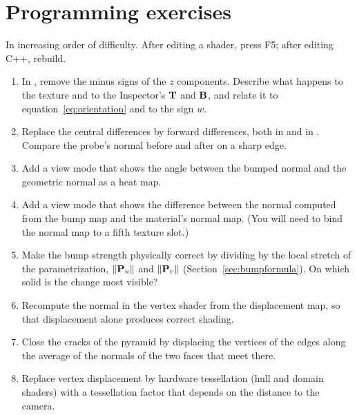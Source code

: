 \section{Programming exercises}
In increasing order of difficulty. After editing a shader, press F5; after editing C++,
rebuild.

\begin{enumerate}[label=\textbf{P\arabic*.}]
\item In , remove the minus signs of the $z$ components. Describe what
happens to the texture and to the Inspector's $\mathbf{T}$ and $\mathbf{B}$, and relate it to
equation~\eqref{eq:orientation} and to the sign $w$.
\item Replace the central differences by forward differences, both in  and in
. Compare the probe's normal before and after on a sharp edge.
\item Add a view mode that shows the angle between the bumped normal and the geometric normal as a
heat map.
\item Add a view mode that shows the difference between the normal computed from the bump map and
the material's normal map. (You will need to bind the normal map to a fifth texture slot.)
\item Make the bump strength physically correct by dividing by the local stretch of the
parametrization, $\lVert\mathbf{P}_u\rVert$ and $\lVert\mathbf{P}_v\rVert$
(Section~\ref{sec:bumpformula}). On which solid is the change most visible?
\item Recompute the normal in the vertex shader from the displacement map, so that displacement
alone produces correct shading.
\item Close the cracks of the pyramid by displacing the vertices of the edges along the average of
the normals of the two faces that meet there.
\item Replace vertex displacement by hardware tessellation (hull and domain shaders) with a
tessellation factor that depends on the distance to the camera.
\end{enumerate}
